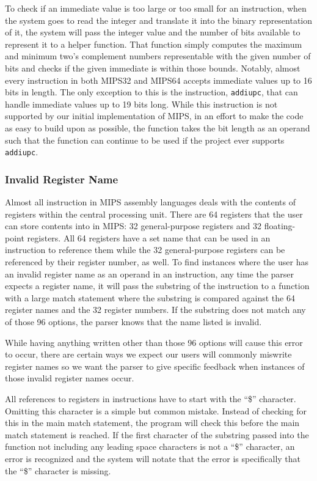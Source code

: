 \documentclass[
    paper=letter,
    parskip=half,
    fontsize=12pt,
    titlepage=firstiscover,
    toc=bibliography,
    numbers=endperiod
]{scrartcl}
\begin{document}
To check if an immediate value is too large or too small for an
instruction, when the system goes to read the integer and translate it
into the binary representation of it, the system will pass the integer
value and the number of bits available to represent it to a helper
function. That function simply computes the maximum and minimum two's
complement numbers representable with the given number of bits and
checks if the given immediate is within those bounds. Notably, almost
every instruction in both MIPS32 and MIPS64 accepts immediate values up
to 16 bits in length. The only exception to this is the instruction,
\texttt{addiupc}, that can handle immediate values up to 19 bits long.
While this instruction is not supported by our initial implementation of
MIPS, in an effort to make the code as easy to build upon as possible,
the function takes the bit length as an operand such that the function
can continue to be used if the project ever supports \texttt{addiupc}.

\subsubsection{Invalid Register Name}

Almost all instruction in MIPS assembly languages deals with the
contents of registers within the central processing unit. There are 64
registers that the user can store contents into in MIPS: 32
general-purpose registers and 32 floating-point registers. All 64
registers have a set name that can be used in an instruction to
reference them while the 32 general-purpose registers can be referenced
by their register number, as well. To find instances where the user has
an invalid register name as an operand in an instruction, any time the
parser expects a register name, it will pass the substring of the
instruction to a function with a large match statement where the
substring is compared against the 64 register names and the 32 register
numbers. If the substring does not match any of those 96 options, the
parser knows that the name listed is invalid.

While having anything written other than those 96 options will cause
this error to occur, there are certain ways we expect our users will
commonly miswrite register names so we want the parser to give specific
feedback when instances of those invalid register names occur.

All references to registers in instructions have to start with the
``\$'' character. Omitting this character is a simple but common
mistake. Instead of checking for this in the main match statement, the
program will check this before the main match statement is reached. If
the first character of the substring passed into the function not
including any leading space characters is not a ``\$'' character, an
error is recognized and the system will notate that the error is
specifically that the ``\$'' character is missing.
\end{document}
